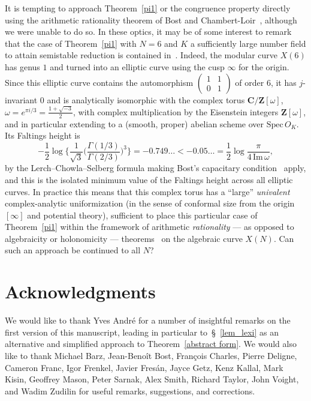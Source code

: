 \documentclass[10pt]{amsart}
\def\SSSS{\S}
\def\spec{\mathrm{Spec} \,}
\def\Z{\mathbf{Z}}
\theoremstyle{remark}
\numberwithin{equation}{subsection}
\def\C{\mathbf{C}}
\begin{document}
It is tempting to approach Theorem~\ref{pi1} or the congruence property directly using the arithmetic rationality theorem of 
Bost and Chambert-Loir~\cite{BCL}, although we were unable to do so.
In these optics, it may be of some interest to remark that the case of Theorem~\ref{pi1} with $N = 6$ and $K$ a sufficiently large number field to attain semistable reduction is  contained in~\cite[Corollary~1.3 with Example~7.2.2 (i)]{Bost}. Indeed, the modular curve $X(6)$ has genus $1$ and turned into an elliptic curve using the cusp $\infty$ for the origin. Since this elliptic curve contains the automorphism $\begin{pmatrix} 1 & 1 \\ 0 & 1 \end{pmatrix}$ of order $6$, it has $j$-invariant $0$ and is analytically isomorphic with the complex torus $\C / \Z[\omega]$, $\omega = e^{\pi i/3} = \frac{1 + \sqrt{-3}}{2}$, with complex multiplication by the Eisenstein integers $\Z[\omega]$, 
and in particular extending to a (smooth, proper) abelian scheme over $\spec{O_K}$. Its Faltings height is 
$$
-\frac{1}{2} \log   \Big\{  \frac{1}{\sqrt{3}} \Big( \frac{\Gamma(1/3)}{\Gamma(2/3)} \Big)^3 \Big\} = -0.749\ldots < -0.05\ldots = \frac{1}{2}\log\frac{\pi}{
4 \, \mathrm{Im} \, \omega},
$$
by the Lerch--Chowla--Selberg formula making Bost's capacitary condition~\cite[Corollary~1.3]{Bost} apply, and this is the isolated minimum value of the Faltings height across all elliptic curves.  In practice this means that this complex torus has a ``large'' \emph{univalent} complex-analytic  uniformization (in the sense of conformal size from the origin $[\infty]$ and potential theory), sufficient to place this particular case of Theorem~\ref{pi1}  within the framework of arithmetic \emph{rationality} --- as opposed to algebraicity
or holonomicity --- theorems~\cite{Bost, BCL} on the algebraic curve $X(N)$.  Can such an approach be continued to all $N$?

\section{Acknowledgments}We would like
to thank Yves Andr\'{e} for a number of insightful remarks
on the first version of this manuscript, leading in particular to~\SSSS~\ref{lem_lexi} as an alternative and simplified approach to Theorem~\ref{abstract form}.
We would also like to thank 
 Michael Barz, Jean-Beno\^{i}t Bost, Fran\c{c}ois Charles, Pierre Deligne, Cameron Franc, Igor Frenkel, Javier Fres\'an, Jayce Getz, Kenz Kallal, Mark Kisin, Geoffrey Mason, Peter Sarnak, Alex Smith,  Richard Taylor, John Voight, 
and Wadim Zudilin
for useful remarks, suggestions, and corrections.




\end{document}
